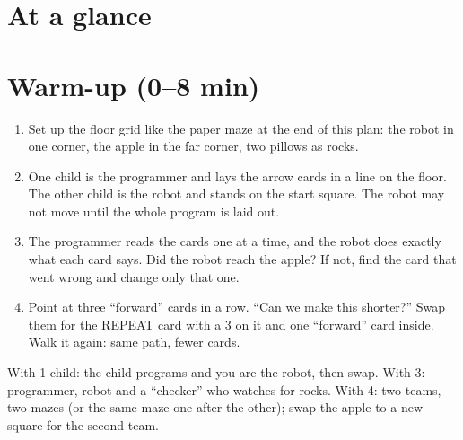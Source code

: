 \section{At a glance}
\begin{timeplan}
\end{timeplan}

\section{Warm-up (0--8 min)}
\begin{unplugged}
\begin{enumerate}[leftmargin=1.4em,itemsep=1pt]
  \item Set up the floor grid like the paper maze at the end of this plan: the robot in one corner, the apple in the far corner, two pillows as rocks.
  \item One child is the programmer and lays the arrow cards in a line on the floor. The other child is the robot and stands on the start square. The robot may not move until the whole program is laid out.
  \item The programmer reads the cards one at a time, and the robot does exactly what each card says. Did the robot reach the apple? If not, find the card that went wrong and change only that one.
  \item Point at three \enquote{forward} cards in a row. \enquote{Can we make this shorter?} Swap them for the REPEAT card with a 3 on it and one \enquote{forward} card inside. Walk it again: same path, fewer cards.
\end{enumerate}
With 1 child: the child programs and you are the robot, then swap. With 3: programmer, robot and a \enquote{checker} who watches for rocks. With 4: two teams, two mazes (or the same maze one after the other); swap the apple to a new square for the second team.
\end{unplugged}

